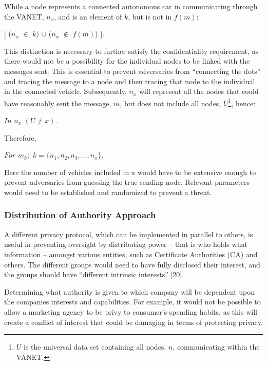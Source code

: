 \documentclass[conference,compsoc]{IEEEtran}
\begin{document}
While a node represents a connected autonomous car in communicating through the VANET, $n_x$, and is an element of $k$, but is not in $f(m)$:\\

\begin {center}
\large $[$ ($n_x$ $\in$ $k$$)$ $\cup$ $(n_x$ $\notin$ $f(m) $) $].$
\break
\end {center}

This distinction is necessary to further satisfy the confidentiality requirement, as there would not be a possibility for the individual nodes to be linked with the messages sent. This is essential to prevent adversaries from “connecting the dots” and tracing the message to a node and then tracing that node to the individual in the connected vehicle. Subsequently, $n_x$ will represent all the nodes that could have reasonably sent the message, $m$, but does not include all nodes, $U$\footnote{$U$ is the universal data set containing all nodes, $n$, communicating within the VANET.}, hence:\\

\begin {center}
\large $In$ $ n_x $ $(U \neq x).$
\break
\end {center}

Therefore,\\

\begin {center}
\large  $For$ $ m_k;$ $ k =\{ n_1, n_2, n_3, ..., n_x\}.$
\break
\end {center}

Here the number of vehicles included in x would have to be extensive enough to prevent adversaries from guessing the true sending node. Relevant parameters would need to be established and randomized to prevent a threat.


\subsubsection{Distribution of Authority Approach}
A different privacy protocol, which can be implemented in parallel to others, is useful in preventing oversight by distributing power – that is who holds what information – amongst various entities, such as Certificate Authorities (CA) and others. The different groups would need to have fully disclosed their interest, and the groups should have “different intrinsic interests” [20]. 

Determining what authority is given to which company will be dependent upon the companies interests and capabilities. For example, it would not be possible to allow a marketing agency to be privy to consumer’s spending habits, as this will create a conflict of interest that could be damaging in terms of protecting privacy. 
\end{document}
